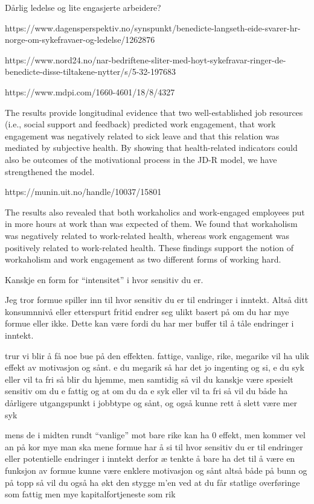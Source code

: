 \documentclass[
  11pt,
  a4paper,
  DIV=11,
  numbers=noendperiod]{scrartcl}
\begin{document}
Dårlig ledelse og lite engasjerte arbeidere?

https://www.dagensperspektiv.no/synspunkt/benedicte-langseth-eide-svarer-hr-norge-om-sykefravaer-og-ledelse/1262876

https://www.nord24.no/nar-bedriftene-sliter-med-hoyt-sykefravar-ringer-de-benedicte-disse-tiltakene-nytter/s/5-32-197683

https://www.mdpi.com/1660-4601/18/8/4327

The results provide longitudinal evidence that two well-established job
resources (i.e., social support and feedback) predicted work engagement,
that work engagement was negatively related to sick leave and that this
relation was mediated by subjective health. By showing that
health-related indicators could also be outcomes of the motivational
process in the JD-R model, we have strengthened the model.

https://munin.uit.no/handle/10037/15801

The results also revealed that both workaholics and work-engaged
employees put in more hours at work than was expected of them. We found
that workaholism was negatively related to work-related health, whereas
work engagement was positively related to work-related health. These
findings support the notion of workaholism and work engagement as two
different forms of working hard.

Kanskje en form for ``intensitet'' i hvor sensitiv du er.

Jeg tror formue spiller inn til hvor sensitiv du er til endringer i
inntekt. Altså ditt konsumnnivå eller etterspurt fritid endrer seg ulikt
basert på om du har mye formue eller ikke. Dette kan være fordi du har
mer buffer til å tåle endringer i inntekt.

trur vi blir å få noe bue på den effekten. fattige, vanlige, rike,
megarike vil ha ulik effekt av motivasjon og sånt. e du megarik så har
det jo ingenting og si, e du syk eller vil ta fri så blir du hjemme, men
samtidig så vil du kanskje være spesielt sensitiv om du e fattig og at
om du da e syk eller vil ta fri så vil du både ha dårligere utgangspunkt
i jobbtype og sånt, og også kunne rett å slett være mer syk

mens de i midten rundt ``vanlige'' mot bare rike kan ha 0 effekt, men
kommer vel an på kor mye man ska mene formue har å si til hvor sensitiv
du er til endringer eller potentielle endringer i inntekt derfor æ
tenkte å bare ha det til å være en funksjon av formue kunne være enklere
motivasjon og sånt altså både på bunn og på topp så vil du også ha økt
den stygge m'en ved at du får statlige overføringe som fattig men mye
kapitalfortjeneste som rik
\end{document}

